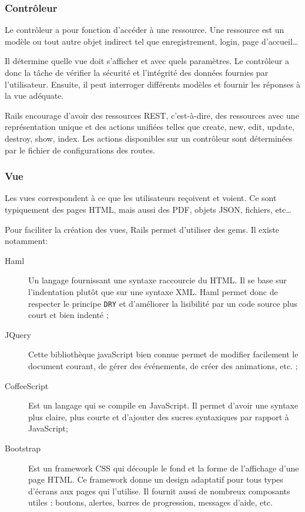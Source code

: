 \subsubsection{Contrôleur}
\label{controleur}
Le contrôleur a pour fonction d'accéder à une ressource. Une ressource est un modèle ou tout autre objet indirect tel que enregistrement, login, page d'accueil\ldots  

Il détermine quelle vue doit s'afficher et avec quels paramètres. Le contrôleur a donc la tâche de vérifier la sécurité et l'intégrité des données fournies par l'utilisateur. Ensuite, il peut interroger différents modèles et fournir les réponses à la vue adéquate.

Rails encourage d'avoir des ressources REST, c'est-à-dire, des ressources avec une représentation unique et des actions unifiées telles que create, new, edit, update, destroy, show, index. Les actions disponibles sur un contrôleur sont déterminées par le fichier de configurations des routes.

\subsubsection{Vue} 
Les vues correspondent à ce que les utilisateurs reçoivent et voient. Ce sont typiquement des pages HTML, mais aussi des PDF, objets JSON, fichiers, etc\ldots

Pour faciliter la création des vues, Rails permet d'utiliser des gems. Il existe notamment: 
\begin{description}
  \item[Haml] Un langage fournissant une syntaxe raccourcie du HTML. Il se base sur l'indentation plutôt que sur une syntaxe XML. Haml permet donc de respecter le principe \texttt{DRY} et d'améliorer la lisibilité par un code source plus court et bien indenté ; \label{haml}
  \item[JQuery] Cette bibliothèque javaScript bien connue permet de modifier facilement le document courant, de gérer des événements, de créer des animations, etc. ;
  \item[CoffeeScript] Est un langage qui se compile en JavaScript. Il permet d'avoir une syntaxe plus claire, plus courte et d'ajouter des sucres syntaxiques par rapport à JavaScript;
  \item[Bootstrap] Est un framework CSS qui découple le fond et la forme de l'affichage d'une page HTML. Ce framework donne un design adaptatif pour tous types d'écrans aux pages qui l'utilise. Il fournit aussi de nombreux composants utiles : boutons, alertes, barres de progression, messages d'aide, etc. \label{bootstrap}
\end{description}
